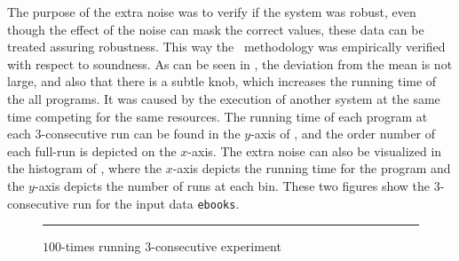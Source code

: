 The purpose of the extra noise was to verify if the system was robust, even though the effect of the noise can mask the correct values, these data can be treated assuring robustness. This way the \CP\ methodology was empirically verified with respect to soundness. As can be seen in , the deviation from the mean is not large, and also that there is a subtle knob, which increases the running time of the all programs. It was caused by the execution of another system at the same time competing for the same resources. The running time of each program at each 3-consecutive run can be found in the $y$-axis of , and the order number of each full-run is depicted on the $x$-axis. The extra noise can also be visualized in the histogram of , where the $x$-axis depicts the running time for the program and the $y$-axis depicts the number of runs at each bin. These two figures show the $3$-consecutive run for the input data {\tt ebooks}.

\begin{figure}
  \centering
  \begin{minipage}[t]{\linewidth}
    \vspace{1em}
    \hrule
    \vspace{1em}
  \end{minipage}
  \caption{$100$-times running $3$-consecutive experiment}
  \label{fig:CProbust}
\end{figure}

